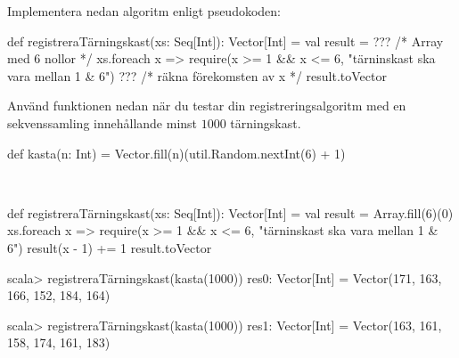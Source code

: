 \Subtask Implementera nedan algoritm enligt pseudokoden:
\begin{Code}
def registreraTärningskast(xs: Seq[Int]): Vector[Int] = {
  val result = ??? /* Array med 6 nollor */
  xs.foreach{ x =>
    require(x >= 1 && x <= 6, "tärninskast ska vara mellan 1 & 6")
    ??? /* räkna förekomsten av x */
  }
  result.toVector
}
\end{Code}

\Subtask Använd funktionen  nedan när du testar din registreringsalgoritm med en sekvenssamling innehållande minst $1000$ tärningskast.
\begin{Code}
def kasta(n: Int) = Vector.fill(n)(util.Random.nextInt(6) + 1)
\end{Code}

\SOLUTION

\TaskSolved \what~

\SubtaskSolved
\begin{Code}
def registreraTärningskast(xs: Seq[Int]): Vector[Int] = {
  val result = Array.fill(6)(0)
  xs.foreach{ x =>
    require(x >= 1 && x <= 6, "tärninskast ska vara mellan 1 & 6")
    result(x - 1) += 1
  }
  result.toVector
}
\end{Code}

\SubtaskSolved
\begin{REPL}
scala> registreraTärningskast(kasta(1000))
res0: Vector[Int] = Vector(171, 163, 166, 152, 184, 164)

scala> registreraTärningskast(kasta(1000))
res1: Vector[Int] = Vector(163, 161, 158, 174, 161, 183)
\end{REPL}

\QUESTEND





\QUESTBEGIN

